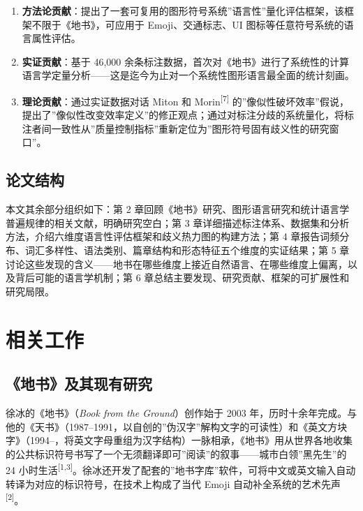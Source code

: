 \documentclass[12pt,a4paper,UTF8,fontset=founder]{ctexart}
\begin{document}
\begin{enumerate}
\def\labelenumi{\arabic{enumi}.}

\item
  \textbf{方法论贡献}：提出了一套可复用的图形符号系统''语言性''量化评估框架，该框架不限于《地书》，可应用于 Emoji、交通标志、UI 图标等任意符号系统的语言属性评估。
\item
  \textbf{实证贡献}：基于 46,000 余条标注数据，首次对《地书》进行了系统性的计算语言学定量分析------这是迄今为止对一个系统性图形语言最全面的统计刻画。
\item
  \textbf{理论贡献}：通过实证数据对话 Miton 和 Morin\textsuperscript{{[}7{]}} 的''像似性破坏效率''假说，提出了''像似性改变效率定义''的修正观点；通过对标注分歧的系统量化，将标注者间一致性从''质量控制指标''重新定位为''图形符号固有歧义性的研究窗口''。
\end{enumerate}

\subsection{论文结构}\label{ux8bbaux6587ux7ed3ux6784}

本文其余部分组织如下：第 2 章回顾《地书》研究、图形语言研究和统计语言学普遍规律的相关文献，明确研究空白；第 3 章详细描述标注体系、数据集和分析方法，介绍六维度语言性评估框架和歧义热力图的构建方法；第 4 章报告词频分布、词汇多样性、语法类别、篇章结构和形态特征五个维度的实证结果；第 5 章讨论这些发现的含义------地书在哪些维度上接近自然语言、在哪些维度上偏离，以及背后可能的语言学机制；第 6 章总结主要发现、研究贡献、框架的可扩展性和研究局限。

\newpage

\section{相关工作}\label{ux76f8ux5173ux5de5ux4f5c}

\subsection{《地书》及其现有研究}\label{ux5730ux4e66ux53caux5176ux73b0ux6709ux7814ux7a76}

徐冰的《地书》（\emph{Book from the Ground}）创作始于 2003 年，历时十余年完成。与他的《天书》（1987--1991，以自创的''伪汉字''解构文字的可读性）和《英文方块字》（1994--，将英文字母重组为汉字结构）一脉相承，《地书》用从世界各地收集的公共标识符号书写了一个无须翻译即可''阅读''的叙事------城市白领''黑先生''的 24 小时生活\textsuperscript{{[}1,3{]}}。徐冰还开发了配套的''地书字库''软件，可将中文或英文输入自动转译为对应的标识符号，在技术上构成了当代 Emoji 自动补全系统的艺术先声\textsuperscript{{[}2{]}}。
\end{document}
